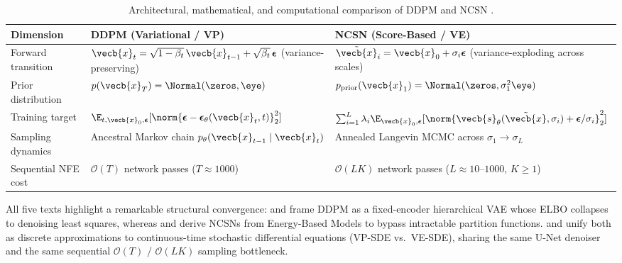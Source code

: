 \documentclass[../../../../master.tex]{subfiles}
\begin{document}
\begin{table}[htbp]
\centering
\caption{Architectural, mathematical, and computational comparison of DDPM and NCSN  .}
\label{tab:ddpm:comparison}
\small
\begin{tabularx}{\textwidth}{@{}l >{\raggedright\arraybackslash}X >{\raggedright\arraybackslash}X@{}}
\toprule
\textbf{Dimension} & \textbf{DDPM (Variational / VP)} & \textbf{NCSN (Score-Based / VE)} \\
\midrule
Forward transition &
  $\vecb{x}_t = \sqrt{1-\beta_t}\,\vecb{x}_{t-1} + \sqrt{\beta_t}\,\boldsymbol{\epsilon}$ (variance-preserving) &
  $\tilde{\vecb{x}}_i = \vecb{x}_0 + \sigma_i\boldsymbol{\epsilon}$ (variance-exploding across scales) \\
Prior distribution &
  $p(\vecb{x}_T) = \Normal(\zeros, \eye)$ &
  $p_{\mathrm{prior}}(\vecb{x}_1) = \Normal(\zeros, \sigma_1^2 \eye)$ \\
Training target &
  $\E_{t,\vecb{x}_0,\boldsymbol{\epsilon}}[\norm{\boldsymbol{\epsilon} - \boldsymbol{\epsilon}_\theta(\vecb{x}_t, t)}_2^2]$ &
  $\sum_{i=1}^L \lambda_i \E_{\vecb{x}_0,\boldsymbol{\epsilon}}[\norm{\vecb{s}_\theta(\tilde{\vecb{x}}, \sigma_i) + \boldsymbol{\epsilon}/\sigma_i}_2^2]$ \\
Sampling dynamics &
  Ancestral Markov chain $p_\theta(\vecb{x}_{t-1} \mid \vecb{x}_t)$ &
  Annealed Langevin MCMC across $\sigma_1 \to \sigma_L$ \\
Sequential NFE cost &
  $\mathcal{O}(T)$ network passes ($T \approx 1000$) &
  $\mathcal{O}(LK)$ network passes ($L \approx 10$--$1000$, $K \ge 1$) \\
\bottomrule
\end{tabularx}
\end{table}

\begin{crossbook}
All five texts highlight a remarkable structural convergence:  and  frame DDPM as a fixed-encoder hierarchical VAE whose ELBO collapses to denoising least squares, whereas  and  derive NCSNs from Energy-Based Models to bypass intractable partition functions.  and  unify both as discrete approximations to continuous-time stochastic differential equations (VP-SDE vs.\ VE-SDE), sharing the same U-Net denoiser and the same sequential $\mathcal{O}(T)$ / $\mathcal{O}(LK)$ sampling bottleneck.
\end{crossbook}
\end{document}
